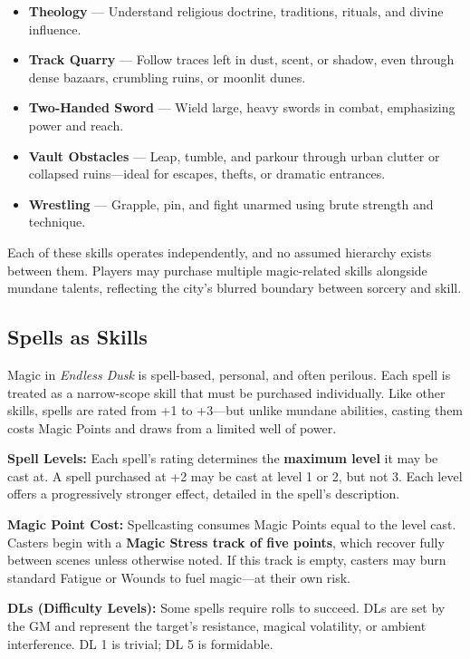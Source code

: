 \begin{itemize}
    \item \textbf{Theology} — Understand religious doctrine, traditions, rituals, and divine influence.
    \item \textbf{Track Quarry} — Follow traces left in dust, scent, or shadow, even through dense bazaars, crumbling ruins, or moonlit dunes.
    \item \textbf{Two-Handed Sword} — Wield large, heavy swords in combat, emphasizing power and reach.
    \item \textbf{Vault Obstacles} — Leap, tumble, and parkour through urban clutter or collapsed ruins—ideal for escapes, thefts, or dramatic entrances.
    \item \textbf{Wrestling} — Grapple, pin, and fight unarmed using brute strength and technique.
\end{itemize}


Each of these skills operates independently, and no assumed hierarchy exists between them. Players may purchase multiple magic-related skills alongside mundane talents, reflecting the city's blurred boundary between sorcery and skill.

\subsection{Spells as Skills}

Magic in \textit{Endless Dusk} is spell-based, personal, and often perilous. Each spell is treated as a narrow-scope skill that must be purchased individually. Like other skills, spells are rated from +1 to +3—but unlike mundane abilities, casting them costs Magic Points and draws from a limited well of power.

\vspace{0.5\baselineskip}
\textbf{Spell Levels:} Each spell’s rating determines the \textbf{maximum level} it may be cast at. A spell purchased at +2 may be cast at level 1 or 2, but not 3. Each level offers a progressively stronger effect, detailed in the spell’s description.

\vspace{0.5\baselineskip}
\textbf{Magic Point Cost:} Spellcasting consumes Magic Points equal to the level cast. Casters begin with a \textbf{Magic Stress track of five points}, which recover fully between scenes unless otherwise noted. If this track is empty, casters may burn standard Fatigue or Wounds to fuel magic—at their own risk.

\vspace{0.5\baselineskip}
\textbf{DLs (Difficulty Levels):} Some spells require rolls to succeed. DLs are set by the GM and represent the target’s resistance, magical volatility, or ambient interference. DL 1 is trivial; DL 5 is formidable.

